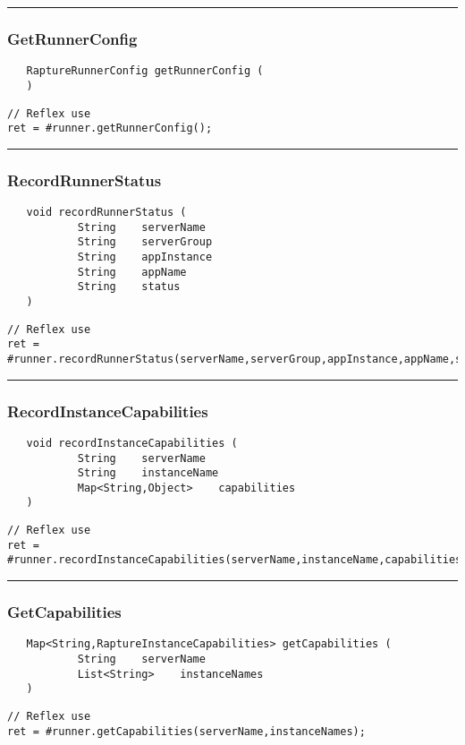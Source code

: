 \rule{15cm}{2pt}
\subsubsection{GetRunnerConfig}
\label{Api:GetRunnerConfig}
\begin{verbatim}
   RaptureRunnerConfig getRunnerConfig (
   )
\end{verbatim}
\begin{lstlisting}[language=reflex]
// Reflex use
ret = #runner.getRunnerConfig();
\end{lstlisting}



\rule{15cm}{2pt}
\subsubsection{RecordRunnerStatus}
\label{Api:RecordRunnerStatus}
\begin{verbatim}
   void recordRunnerStatus (
           String    serverName
           String    serverGroup
           String    appInstance
           String    appName
           String    status
   )
\end{verbatim}
\begin{lstlisting}[language=reflex]
// Reflex use
ret = #runner.recordRunnerStatus(serverName,serverGroup,appInstance,appName,status);
\end{lstlisting}



\rule{15cm}{2pt}
\subsubsection{RecordInstanceCapabilities}
\label{Api:RecordInstanceCapabilities}
\begin{verbatim}
   void recordInstanceCapabilities (
           String    serverName
           String    instanceName
           Map<String,Object>    capabilities
   )
\end{verbatim}
\begin{lstlisting}[language=reflex]
// Reflex use
ret = #runner.recordInstanceCapabilities(serverName,instanceName,capabilities);
\end{lstlisting}



\rule{15cm}{2pt}
\subsubsection{GetCapabilities}
\label{Api:GetCapabilities}
\begin{verbatim}
   Map<String,RaptureInstanceCapabilities> getCapabilities (
           String    serverName
           List<String>    instanceNames
   )
\end{verbatim}
\begin{lstlisting}[language=reflex]
// Reflex use
ret = #runner.getCapabilities(serverName,instanceNames);
\end{lstlisting}



